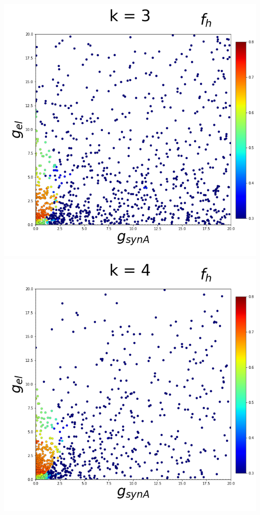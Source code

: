 \documentclass[11pt]{article}
\begin{document}
\begin{center}
\includegraphics[scale=0.125]{DSN_figs/STGCircuit_DSN_c=0_rs=3_k=3.png}
\includegraphics[scale=0.125]{DSN_figs/STGCircuit_DSN_c=0_rs=3_k=4.png}

\end{center}
\end{document}
